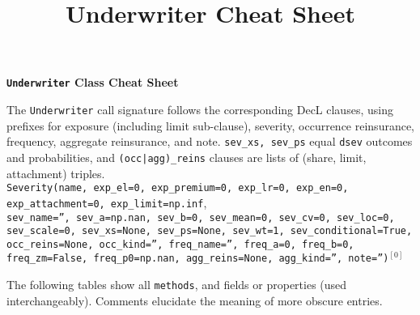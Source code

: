 \documentclass{article}
\title{Underwriter Cheat Sheet}
\begin{document}
{\huge{\bf \textbf{\texttt{Underwriter} Class Cheat Sheet}}}

\raggedright The \texttt{Underwriter} call signature follows the corresponding DecL clauses, using prefixes for exposure (including limit sub-clause), severity, occurrence reinsurance, frequency, aggregate reinsurance, and note. \texttt{sev\_xs, sev\_ps} equal \texttt{dsev} outcomes and probabilities, and \texttt{(occ|agg)\_reins} clauses are lists of (share, limit, attachment) triples. \\
 \texttt{\m Severity(name, exp\_el=0, exp\_premium=0, exp\_lr=0, exp\_en=0, exp\_attachment=0, exp\_limit=np.inf}, \\
 \texttt{\phantom{\m}sev\_name='', sev\_a=np.nan, sev\_b=0, sev\_mean=0, sev\_cv=0, sev\_loc=0, sev\_scale=0, sev\_xs=None, sev\_ps=None, sev\_wt=1, sev\_conditional=True, }\\
 \texttt{\phantom{\m}occ\_reins=None, occ\_kind='', freq\_name='', freq\_a=0, freq\_b=0, freq\_zm=False, freq\_p0=np.nan, agg\_reins=None, agg\_kind='', note='')}${}^{[0]}$

The following tables show all \texttt{\m methods}, and fields or properties (used interchangeably). Comments elucidate the meaning of more obscure entries.
\end{document}
